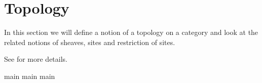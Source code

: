 \section{Topology}
In this section we will define a notion of a topology on a category and 
look at the related notions of sheaves, sites and restriction of sites.

See \cite{sheavGeomLogic} for more details.


{main}
{main}
{main}